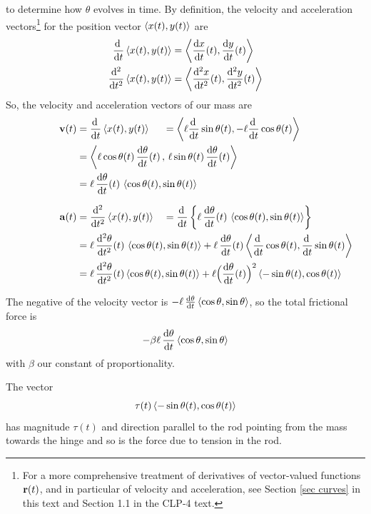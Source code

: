 to determine how $\theta$ evolves in time. By definition, the
velocity and acceleration vectors\footnote{For a more comprehensive treatment 
of derivatives of vector-valued functions $\mathbf{r}(t)$, and in particular of
velocity and acceleration, see Section \ref{sec curves} in this text and
Section 1.1 in the CLP-4 text.} for the position vector 
$\left< x(t),y(t)\right>$ are
\begin{align*}
\diff{}{t}\llt x(t),y(t)\rgt 
   &= \llt \diff{x}{t}(t),\diff{y}{t}(t)\rgt \\
\ddiff{2}{}{t}\llt x(t),y(t)\rgt 
   &=\llt \ddiff{2}{x}{t}(t),\ddiff{2}{y}{t}(t)\rgt 
\end{align*}
So, the velocity and acceleration vectors of our mass are
\begin{alignat*}{3}
\vv(t)&=\diff{}{t}\llt x(t),y(t)\rgt 
&&=\llt \ell\diff{}{t}\sin\theta(t),-\ell\diff{}{t}\cos\theta(t)\rgt \\
&=\llt \ell\cos\theta(t)\,\diff{\theta}{t}(t)\,,\,
             \ell\sin\theta(t)\,\diff{\theta}{t}(t)\rgt\hidewidth \\
&=\ell\,\diff{\theta}{t}(t)\,\llt \cos\theta(t),\sin\theta(t)\rgt \hidewidth
  \\[0.1in]
\va(t)&=\ddiff{2}{}{t}\llt x(t),y(t)\rgt 
&&=\diff{}{t}
  \left\{\ell\,\diff{\theta}{t}(t)\,
               \llt \cos\theta(t),\sin\theta(t)\rgt \right\} \\ 
&=\ell\,\ddiff{2}{\theta}{t}(t)\,\llt \cos\theta(t),\sin\theta(t)\rgt 
+\ell\,\diff{\theta}{t}(t)
       \llt \diff{}{t}\cos\theta(t),\diff{}{t}\sin\theta(t)\rgt \,\hidewidth\\
&= \ell\,\ddiff{2}{\theta}{t}(t)\llt \cos\theta(t),\sin\theta(t)\rgt 
+\ell \Big(\diff{\theta}{t}(t)\Big)^2
     \llt -\sin\theta(t),\cos\theta(t)\rgt\hidewidth
\end{alignat*}

The negative of the velocity vector is  
$- \ell\, \diff{\theta}{t}\llt \cos\theta,\sin\theta\rgt$, so the total frictional force is 
\begin{equation*}
-\beta\ell\, \diff{\theta}{t}\llt \cos\theta,\sin\theta\rgt 
\end{equation*} 
with $\beta$ our constant of proportionality. 

The vector 
\begin{equation*}
\tau(t) \left< -\sin\theta(t),\cos\theta(t)\right> 
\end{equation*}
has magnitude $\tau(t)$ and direction parallel to the rod pointing 
from the mass towards the hinge and so is the force due to tension 
in the rod. 

